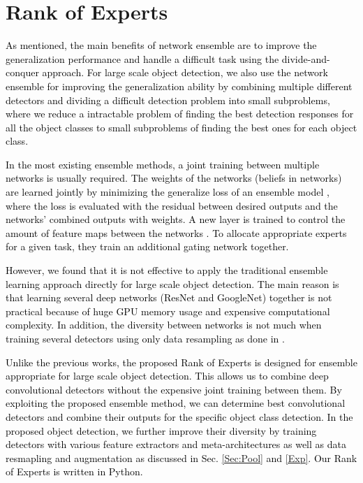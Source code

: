 \documentclass[10pt,twocolumn,letterpaper]{article}
\newcommand{\RE}{\textcolor{black}}
\newcommand{\RV}{\textcolor{black}}
\begin{document}
\section{Rank of Experts}
\label{Ranking}
\RE{As mentioned, the main benefits of network ensemble are to improve the generalization performance and handle a difficult task using the divide-and-conquer approach. 
For large scale object detection, we also use the network ensemble for improving the generalization ability by combining multiple  different detectors  and dividing a difficult detection problem into small subproblems, where we reduce a intractable problem of finding the \RV{best detection responses} for  all the object classes to small subproblems of finding the best ones for each object class.}


\RE{In the most existing ensemble methods, a joint training between multiple networks is usually required. The weights  of the networks (\ie  beliefs in networks) are learned jointly by minimizing the generalize loss of an ensemble model \cite{JacobsJNH_NC91, ZhouWT_AI02,Polikar_CSM06}, where the loss is evaluated with the residual between desired outputs and the networks' combined outputs with weights.  A new layer is trained to control the amount of feature maps between the networks \cite{ParkHBB_WACV16}. To allocate  appropriate experts for a given task, \RV{they} \cite{JacobsJNH_NC91, JordanJ_NC94,HuangRSZKFFWSG_Corr16, LasotaLTT_ACIDS14} train an additional gating network together.}  




\RE{However, we found that it is not effective to apply the traditional ensemble learning approach directly for large scale object detection. The main reason is that learning \RV{several deep networks (\eg ResNet and GoogleNet)} together is not practical because of huge GPU memory usage and expensive computational complexity. In addition, the diversity between networks is not much} \RV{when training several detectors using only data resampling  as done in \cite{JacobsJNH_NC91, JordanJ_NC94, KroghV_NIPS94, ZhouWT_AI02}.} 

\RE{Unlike the previous works, the proposed Rank of Experts is designed for ensemble \RV{appropriate for} large scale object detection. This allows us to combine deep convolutional detectors without the expensive joint training between them. By exploiting the proposed ensemble method, we can determine best convolutional detectors and combine their outputs for the specific object class detection. In the proposed object detection, we further improve their diversity by training detectors with \RV{various} feature extractors and meta-architectures as well as data resmapling and augmentation as discussed in  Sec. \ref{Sec:Pool} and \ref{Exp}. Our \RV{Rank of Experts} is written in Python. }
\end{document}
